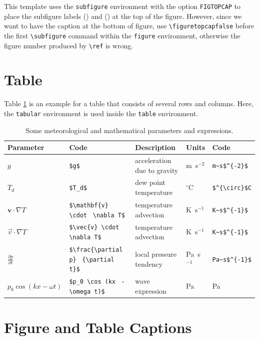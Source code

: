 This template uses the \texttt{subfigure} environment with the option
\texttt{FIGTOPCAP} to place the subfigure labels () and
() at the top of the figure. However, since we want to have the
caption at the bottom of figure, use \verb|\figuretopcapfalse|
before the first \verb|\subfigure| command within the \texttt{figure}
environment, otherwise the figure number produced by \verb|\ref| is wrong.


\section{Table}
Table \ref{tab:1} is an example for a table that consists of several
rows and columns. Here, the \texttt{tabular} environment is used inside the
\texttt{table} environment.


\begin{table}[!htb]
\centering
\begin{footnotesize}
\renewcommand{\tabcolsep}{4pt}
\begin{tabular}{l p{3.5cm} l l l}
\hline
\hline
Parameter & Code & Description & Units & Code\\
\hline
$g$ & \verb|$g$| & acceleration due to gravity&
  m~s$^{-2}$ & \verb|m~s$^{-2}$| \\
$T_d$ & \verb|$T_d$| & dew point temperature & $^{\circ}$C & 
  \verb|$^{\circ}$C| \\
$\mathbf{v} \cdot \nabla T$ & \verb|$\mathbf{v} \cdot| \verb| \nabla T$| &
  temperature advection & K~s$^{-1}$ & \verb|K~s$^{-1}$| \\
$\vec{v} \cdot \nabla T$ & \verb|$\vec{v} \cdot| \verb| \nabla T$| & 
  temperature advection & K~s$^{-1}$ & \verb|K~s$^{-1}$| \\
$\frac{\partial p}{\partial t}$ & \verb|$\frac{\partial p}|
  \verb| {\partial t}$| & local pressure tendency & Pa~s$^{-1}$ &
  \verb|Pa~s$^{-1}$| \\
$p_0 \cos (kx - \omega t)$ & \verb|$p_0 \cos (kx| \verb| - \omega t)$| &
 wave expression & Pa & Pa \\
\hline
\end{tabular}
\end{footnotesize}
\caption{Some meteorological and mathematical parameters and expressions.}
\label{tab:1}
\end{table}


\section{Figure and Table Captions}

